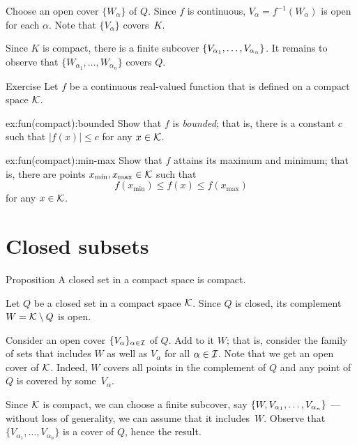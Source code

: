 Choose an open cover $\{W_\alpha\}$ of $Q$.
Since $f$ is continuous, $V_\alpha=f^{-1}(W_\alpha)$ is open for each $\alpha$.
Note that $\{V_\alpha\}$ covers~$K$.

Since $K$ is compact, there is a finite subcover $\{V_{\alpha_1},\z\ldots, V_{\alpha_n}\}$.
It remains to observe that $\{W_{\alpha_1},\ldots, W_{\alpha_n}\}$ covers $Q$.
\qeds

\begin{thm}{Exercise}\label{ex:fun(compact)}
Let $f$ be a continuous real-valued function that is defined on a compact space $\mathcal{K}$.

\begin{subthm}{ex:fun(compact):bounded}
Show that $f$ is \emph{bounded}; that is, there is a constant $c$ such that $|f(x)|\le c$ for any $x\in\mathcal{K}$.
\end{subthm}

\begin{subthm}{ex:fun(compact):min-max}
Show that $f$ attains its maximum and minimum; that is, there are points $x_{\min},x_{\max}\in \mathcal{K}$ such that
\[f(x_{\min})\le f(x)\le f(x_{\max})\]
for any $x\in \mathcal{K}$.
\end{subthm}

\end{thm}

\section{Closed subsets}

\begin{thm}{Proposition}\label{prop:compact-closed}
A closed set in a compact space is compact.
\end{thm}

Let $Q$ be a closed set in a compact space $\mathcal{K}$.
Since $Q$ is closed, its complement $W=\mathcal{K}\setminus Q$ is open.

Consider an open cover $\{V_\alpha\}_{\alpha\in\mathcal{I}}$ of $Q$.
Add to it $W$; that is, consider the family of sets that includes $W$ as well as $V_\alpha$ for all $\alpha\in\mathcal{I}$.
Note that we get an open cover of $\mathcal{K}$.
Indeed, $W$ covers all points in the complement of $Q$ and any point of $Q$ is covered by some~$V_\alpha$.

Since $\mathcal{K}$ is compact, we can choose a finite subcover, say $\{W,V_{\alpha_1},\z\ldots,V_{\alpha_n}\}$ --- without loss of generality, we can assume that it includes~$W$.
Observe that $\{V_{\alpha_1},\ldots,V_{\alpha_n}\}$ is a cover of $Q$, hence the result.
\qeds

